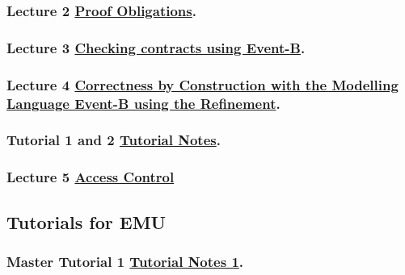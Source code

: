 \documentclass[ 12pt]{article}
\begin{document}
\subsubsection{Lecture 2
    \href{http://mery54.github.io/teaching/mosos/lecturesnotes/mcfsi-maynooth-po.pdf}{Proof
      Obligations}.}


  
\subsubsection{Lecture 3
    \href{http://mery54.github.io/teaching/mosos/lecturesnotes/mcfsi-maynooth-verification.pdf}{Checking
      contracts using Event-B}.}

  

  \subsubsection{Lecture 4
    \href{http://mery54.github.io/teaching/mosos/lecturesnotes/mcfsi-maynooth-lect2.pdf}{Correctness by Construction with the  
      Modelling Language Event-B using the Refinement}.}
  \label{sec:lect-3-hrefhttp:m}

  \subsubsection{Tutorial  1 and 2
    \href{http://mery54.github.io/teaching/mosos/lecturesnotes/mcfsi-maynooth-tut.pdf}{Tutorial
      Notes}.}
\label{sec:tuthrefhttp:m}


\subsubsection{ Lecture 5 
    \href{http://mery54.github.io/teaching/mosos/lecturesnotes/mcfsi-maynooth-lect3.pdf}{Access 
      Control }
  }

\subsection{Tutorials for EMU}


  
   \subsubsection{Master Tutorial  1 
    \href{http://mery54.github.io/teaching/mosos/lecturesnotes/mastertutorial1.pdf}{Tutorial
      Notes 1}.}
\label{sec:tuthrefhttp:mb}
\end{document}

